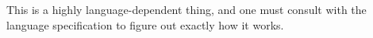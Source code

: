 \begin{remark*}
  This is a highly language-dependent thing, and one must consult with the language specification to figure out exactly how it works.
\end{remark*}



